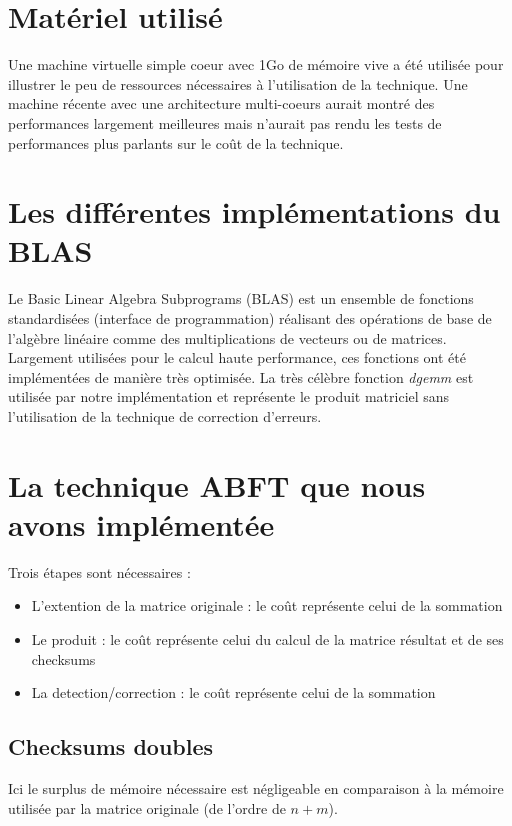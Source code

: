 \documentclass[a4paper, 10pt]{report}
\begin{document}
\section{Matériel utilisé}
Une machine virtuelle simple coeur avec 1Go de mémoire vive a été utilisée pour illustrer le peu de ressources nécessaires à l'utilisation de la technique.\newline
Une machine récente avec une architecture multi-coeurs aurait montré des performances largement meilleures mais n'aurait pas rendu les tests de performances plus parlants
sur le co\^ut de la technique.

\section{Les différentes implémentations du BLAS}
Le Basic Linear Algebra Subprograms (BLAS) est un ensemble de fonctions standardisées (interface de programmation) réalisant des opérations de base de l'algèbre linéaire comme des multiplications de vecteurs ou de matrices. Largement utilisées pour le calcul haute performance, ces fonctions ont été implémentées de manière très optimisée.\newline
La très célèbre fonction \textit{dgemm} est utilisée par notre implémentation et représente le produit matriciel sans l'utilisation de la technique de correction d'erreurs.

\section{La technique ABFT \cite{Huang} que nous avons implémentée}
Trois étapes sont nécessaires :
\begin{itemize}
\item L'extention de la matrice originale : le co\^ut représente celui de la sommation
\item Le produit : le co\^ut représente celui du calcul de la matrice résultat et de ses checksums
\item La detection/correction : le co\^ut représente celui de la sommation
\end{itemize}

\subsection{Checksums doubles}
Ici le surplus de mémoire nécessaire est négligeable en comparaison à la mémoire utilisée par la matrice originale (de l'ordre de $n + m$).
\end{document}
